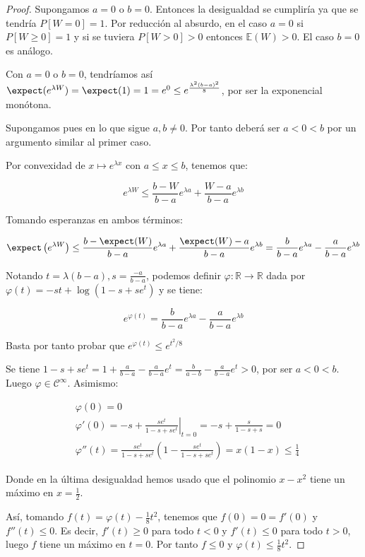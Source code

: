 \begin{proof}
 Supongamos $a=0$ o $b=0$. Entonces la desigualdad se cumpliría ya que se tendría $P[W=0]=1$. Por
 reducción al absurdo, en el caso $a=0$ si $P[W\ge 0] = 1$ y si se tuviera $P[W>0] > 0$ entonces $\mathbb{E}(W) > 0$.
 El caso $b=0$ es análogo.
 
 Con $a=0$ o $b=0$, tendríamos así $\expect(e^{\lambda W}) = \expect(1) = 1 = e^0 \le e^{\frac{\lambda^2 (b-a)^2}{8}}$, 
 por ser la exponencial monótona. 
 
 Supongamos pues en lo que sigue $a, b\neq 0$. Por tanto deberá ser $a < 0 < b$ por un argumento similar al
 primer caso.
 
 Por convexidad de $x\mapsto e^{\lambda x}$ con $a\le x \le b$, tenemos que:
 
 \[e^{\lambda W} \le \frac{b-W}{b-a} e^{\lambda a} + \frac{W-a}{b-a}e^{\lambda b}\]

 Tomando esperanzas en ambos términos:
 
 \[\expect \left(e^{\lambda W}\right) \le \frac{b-\expect(W)}{b-a} e^{\lambda a} + 
   \frac{\expect(W)-a}{b-a}e^{\lambda b} = \frac{b}{b-a} e^{\lambda a} - \frac{a}{b-a} e^{\lambda b}\]
 
 Notando $t = \lambda(b-a), s = \frac{-a}{b-a}$, podemos definir $\varphi : \mathbb{R} \rightarrow \mathbb{R}$
 dada por $\varphi(t) = -st + \log(1-s+se^t)$ y se tiene:
 
 \[e^{\varphi(t)} = \frac{b}{b-a} e^{\lambda a} - \frac{a}{b-a} e^{\lambda b}\]
 
 Basta por tanto probar que $e^{\varphi(t)} \le e^{t^2/8}$
 
 Se tiene $1-s+se^t = 1 + \frac{a}{b-a} - \frac{a}{b-a} e^t = \frac{b}{a-b} - \frac{a}{b-a} e^t > 0$, por
 ser $a< 0 < b$. Luego $\varphi\in \mathcal{C}^{\infty}$. Asimismo:
 
 \begin{align*}
  &\varphi(0) = 0 \\  
  & \varphi'(0) = \left.-s + \frac{se^t}{1-s+se^t} \right|_{t=0} = -s + \frac{s}{1-s+s} = 0\\
  & \varphi''(t) = \frac{se^t}{1-s+se^t} \left(1-\frac{se^t}{1-s+se^t}\right) = x(1-x) \le \frac{1}{4}
 \end{align*}
 
 Donde en la última desigualdad hemos usado que el polinomio $x-x^2$ tiene un máximo en $x=\frac{1}{2}$.
 
 Así, tomando $f(t) = \varphi(t) - \frac{1}{8}t^2$, tenemos que $f(0) = 0 = f'(0)$ y $f''(t) \le 0$. Es decir, 
 $f'(t) \ge 0$ para todo $t<0$ y $f'(t) \le 0$ para todo $t > 0$, luego $f$ tiene un máximo en $t=0$. Por tanto
 $f \le 0$ y $\varphi(t) \le \frac{1}{8} t^2$.
 \end{proof}



